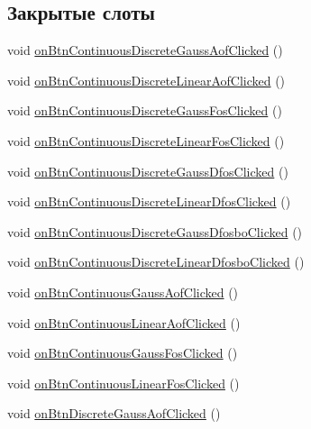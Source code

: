 \subsection*{Закрытые слоты}
{\bf }\par
\begin{DoxyCompactItemize}
\item 
void \hyperlink{class_filter_start_buttons_box_ae7a3648f3c75d184a32cb42e7e1f4d84}{on\+Btn\+Continuous\+Discrete\+Gauss\+Aof\+Clicked} ()
\item 
void \hyperlink{class_filter_start_buttons_box_ae9d6e1bec50f96b2377e2a85bb4e73ca}{on\+Btn\+Continuous\+Discrete\+Linear\+Aof\+Clicked} ()
\item 
void \hyperlink{class_filter_start_buttons_box_a165d56507e4ed134260bbe37bf9fd858}{on\+Btn\+Continuous\+Discrete\+Gauss\+Fos\+Clicked} ()
\item 
void \hyperlink{class_filter_start_buttons_box_a469814e3d3b955558f80ac183f3450e7}{on\+Btn\+Continuous\+Discrete\+Linear\+Fos\+Clicked} ()
\item 
void \hyperlink{class_filter_start_buttons_box_a928032e48d077e6e05f522c5a63efde3}{on\+Btn\+Continuous\+Discrete\+Gauss\+Dfos\+Clicked} ()
\item 
void \hyperlink{class_filter_start_buttons_box_a5d435bcb19360e97bf81205d21cc88ca}{on\+Btn\+Continuous\+Discrete\+Linear\+Dfos\+Clicked} ()
\item 
void \hyperlink{class_filter_start_buttons_box_af89dad25104363913b9a965cbfd417e8}{on\+Btn\+Continuous\+Discrete\+Gauss\+Dfosbo\+Clicked} ()
\item 
void \hyperlink{class_filter_start_buttons_box_a21b70f241dd25b7a84c515ca3fed37e8}{on\+Btn\+Continuous\+Discrete\+Linear\+Dfosbo\+Clicked} ()
\item 
void \hyperlink{class_filter_start_buttons_box_a41f3677ea143b683d6e7d78657c9d794}{on\+Btn\+Continuous\+Gauss\+Aof\+Clicked} ()
\item 
void \hyperlink{class_filter_start_buttons_box_a8afe02f419e8e98bdac1846c2b7db588}{on\+Btn\+Continuous\+Linear\+Aof\+Clicked} ()
\item 
void \hyperlink{class_filter_start_buttons_box_a357e28766d55a027f4bf29f9f7e6e288}{on\+Btn\+Continuous\+Gauss\+Fos\+Clicked} ()
\item 
void \hyperlink{class_filter_start_buttons_box_a2dafb5ddb0f1c4dbf1a5e88d356b5fdc}{on\+Btn\+Continuous\+Linear\+Fos\+Clicked} ()
\item 
void \hyperlink{class_filter_start_buttons_box_a08891ce1d3fc71d2358ba9f48e076fd7}{on\+Btn\+Discrete\+Gauss\+Aof\+Clicked} ()

\end{DoxyCompactItemize}
